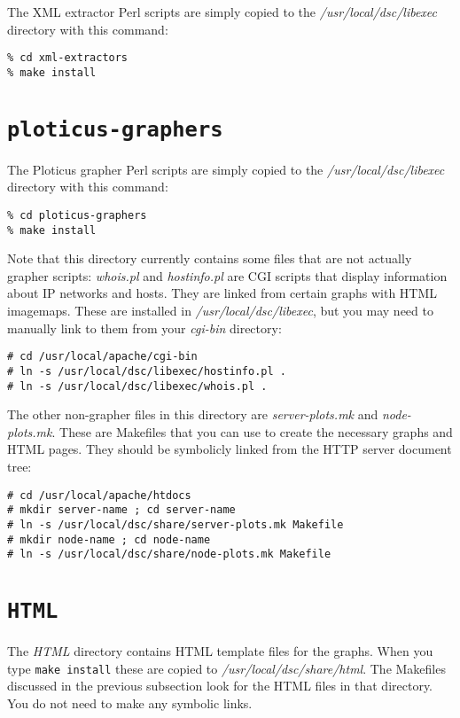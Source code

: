 \documentclass{report}
\begin{document}
The XML extractor Perl scripts are simply copied to the
{\em /usr/local/dsc/libexec\/} directory with this command:

\begin{verbatim}
% cd xml-extractors
% make install
\end{verbatim}

\section{\tt ploticus-graphers}

The Ploticus grapher Perl scripts are simply copied to the
{\em /usr/local/dsc/libexec\/} directory with this command:

\begin{verbatim}
% cd ploticus-graphers
% make install
\end{verbatim}

\noindent
Note that this directory currently contains some files that are not
actually grapher scripts: {\em whois.pl\/} and {\em hostinfo.pl\/}
are CGI scripts that display information about IP networks and hosts.
They are linked from certain graphs with HTML imagemaps.  These are
installed in {\em /usr/local/dsc/libexec\/}, but you may need to manually
link to them from your {\em cgi-bin\/} directory:

\begin{verbatim}
# cd /usr/local/apache/cgi-bin
# ln -s /usr/local/dsc/libexec/hostinfo.pl .
# ln -s /usr/local/dsc/libexec/whois.pl .
\end{verbatim}

\noindent
The other non-grapher files in this directory are {\em server-plots.mk\/}
and {\em node-plots.mk\/}.  These are Makefiles that you can use to create
the necessary graphs and HTML pages.  They should be symbolicly linked
from the HTTP server document tree:

\begin{verbatim}
# cd /usr/local/apache/htdocs
# mkdir server-name ; cd server-name
# ln -s /usr/local/dsc/share/server-plots.mk Makefile
# mkdir node-name ; cd node-name
# ln -s /usr/local/dsc/share/node-plots.mk Makefile
\end{verbatim}

\section{\tt HTML}

The {\em HTML\/} directory contains HTML template files for the graphs.
When you type {\tt make install\/} these are copied to
{\em /usr/local/dsc/share/html\/}.  The Makefiles discussed in
the previous subsection look for the HTML files in that directory.
You do not need to make any symbolic links.
\end{document}
